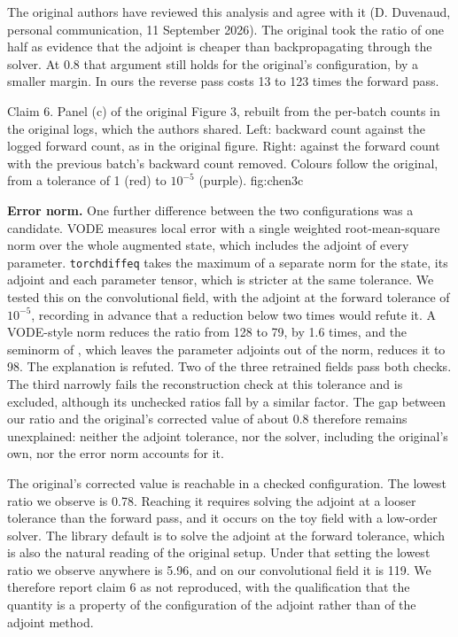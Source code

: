 The original authors have reviewed this analysis and agree with it
(D. Duvenaud, personal communication, 11 September 2026). The original took the ratio of one half as
evidence that the adjoint is cheaper than backpropagating through the solver. At 0.8 that argument still holds for the original's configuration, by a smaller margin. In ours
the reverse pass costs 13 to 123 times the forward pass.

  {Claim 6. Panel (c) of the original Figure 3, rebuilt from the per-batch counts in the
   original logs, which the authors shared. Left: backward count against the logged forward
   count, as in the original figure. Right: against the forward count with the previous
   batch's backward count removed. Colours follow the original, from a tolerance of 1 (red)
   to $10^{-5}$ (purple).}
  {fig:chen3c}

\textbf{Error norm.} One further difference between the two configurations was a candidate.
VODE measures local error with a single weighted root-mean-square norm over the whole augmented
state, which includes the adjoint of every parameter. \texttt{torchdiffeq} takes the maximum of
a separate norm for the state, its adjoint and each parameter tensor, which is stricter at the
same tolerance. We tested this on the convolutional field, with the adjoint at the forward
tolerance of $10^{-5}$, recording in advance that a reduction below two times would refute it.
A VODE-style norm reduces the ratio from 128 to 79, by 1.6 times, and the seminorm of
\citet{kidger2021hey}, which leaves the parameter adjoints out of the norm, reduces it to 98.
The explanation is refuted. Two of the three retrained fields pass both checks. The third
narrowly fails the reconstruction check at this tolerance and is excluded, although its unchecked
ratios fall by a similar factor. The gap between our ratio and the original's
corrected value of about 0.8 therefore remains unexplained: neither the adjoint tolerance,
nor the solver, including the original's own, nor the error norm accounts for it.

The original's corrected value is reachable in a checked configuration. The lowest ratio
we observe is 0.78. Reaching it requires solving the adjoint at a looser tolerance than the
forward pass, and it occurs on the toy field with a low-order solver. The library default is to solve the adjoint at the forward tolerance, which is also the natural
reading of the original setup. Under that setting the lowest ratio we observe anywhere is 5.96,
and on our convolutional field it is 119. We therefore report claim 6 as not reproduced, with the qualification
that the quantity is a property of the configuration of the adjoint rather than of the adjoint
method. 

